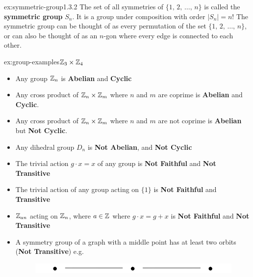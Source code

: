 \documentclass[landscape, 8pt]{extarticle}
\begin{document}
\begin{multicols}{3}
\begin{xmp}{ex:symmetric-group}{1.3.2}
The set of all symmetries of $\{1,\, 2,\,\dots,\,n\}$ is called the \textbf{symmetric group} $S_{n}$. It is a group under composition with order $\lvert S_{n}  \rvert = n!$ The symmetric group can be thought of as every permutation of the set $\{1,\, 2,\,\dots,\,n\}$, or can also be thought of as an $n$-gon where every edge is connected to each other. 
\end{xmp}
\vspace{-5pt}

\begin{xmp}{ex:group-examples}{$\mathbb{Z}_{3} \times \mathbb{Z}_{4}$}
    \renewcommand\labelitemi{\tiny$\bullet$}
    \begin{itemize}
        \setlength\itemsep{0em}
        \item Any group $\mathbb{Z}_{n}$ is \textbf{Abelian} and \textbf{Cyclic}
        \item Any cross product of $\mathbb{Z}_{n} \times \mathbb{Z}_{m}$ where $n$ and $m$ are coprime is \textbf{Abelian} and \textbf{Cyclic}.
        \item Any cross product of $\mathbb{Z}_{n} \times \mathbb{Z}_{m}$ where $n$ and $m$ are not coprime is \textbf{Abelian} but \textbf{Not Cyclic}.
        \item Any dihedral group $D_{n}$ is \textbf{Not Abelian}, and \textbf{Not Cyclic}
        \item The trivial action $g\cdot x = x$ of any group is \textbf{Not Faithful} and \textbf{Not Transitive}
        \item The trivial action of any group acting on $\{1\}$ is \textbf{Not Faithful} and \textbf{Transitive}
        \item $\mathbb{Z}_{an}$ acting on $\mathbb{Z}_{n}$, where $a\in \mathbb{Z}$ where $g\cdot x=g+x$ is \textbf{Not Faithful} and \textbf{Not Transitive}
        \item A symmetry group of a graph with a middle point has at least two orbits (\textbf{Not Transitive}) e.g.
        \vspace{-5pt}
        \begin{figure}[H]
            \centering
            \includegraphics[width=0.5\linewidth]{images/orbit.png}
        \end{figure}
    \end{itemize}
    \end{xmp}
    \vspace{-5pt}


\end{multicols}
\end{document}

